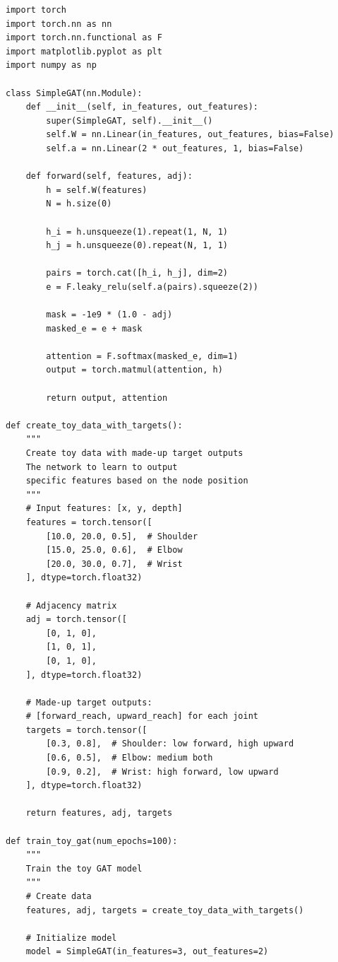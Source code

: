 \begin{lstlisting}[style=pythonstyle,title={Toy problem with fake training},label={code:toy_problem_with_fake_training}]
import torch
import torch.nn as nn
import torch.nn.functional as F
import matplotlib.pyplot as plt
import numpy as np

class SimpleGAT(nn.Module):
    def __init__(self, in_features, out_features):
        super(SimpleGAT, self).__init__()
        self.W = nn.Linear(in_features, out_features, bias=False)
        self.a = nn.Linear(2 * out_features, 1, bias=False)
        
    def forward(self, features, adj):
        h = self.W(features)
        N = h.size(0)
        
        h_i = h.unsqueeze(1).repeat(1, N, 1)
        h_j = h.unsqueeze(0).repeat(N, 1, 1)
        
        pairs = torch.cat([h_i, h_j], dim=2)
        e = F.leaky_relu(self.a(pairs).squeeze(2))
        
        mask = -1e9 * (1.0 - adj)
        masked_e = e + mask
        
        attention = F.softmax(masked_e, dim=1)
        output = torch.matmul(attention, h)
        
        return output, attention

def create_toy_data_with_targets():
    """
    Create toy data with made-up target outputs
    The network to learn to output 
    specific features based on the node position
    """
    # Input features: [x, y, depth]
    features = torch.tensor([
        [10.0, 20.0, 0.5],  # Shoulder
        [15.0, 25.0, 0.6],  # Elbow
        [20.0, 30.0, 0.7],  # Wrist
    ], dtype=torch.float32)
    
    # Adjacency matrix
    adj = torch.tensor([
        [0, 1, 0],
        [1, 0, 1],
        [0, 1, 0],
    ], dtype=torch.float32)
    
    # Made-up target outputs: 
    # [forward_reach, upward_reach] for each joint
    targets = torch.tensor([
        [0.3, 0.8],  # Shoulder: low forward, high upward
        [0.6, 0.5],  # Elbow: medium both
        [0.9, 0.2],  # Wrist: high forward, low upward
    ], dtype=torch.float32)
    
    return features, adj, targets

def train_toy_gat(num_epochs=100):
    """
    Train the toy GAT model
    """
    # Create data
    features, adj, targets = create_toy_data_with_targets()
    
    # Initialize model
    model = SimpleGAT(in_features=3, out_features=2)
    

\end{lstlisting}
